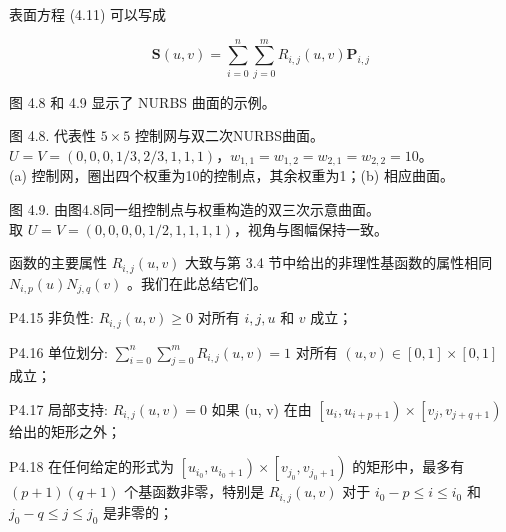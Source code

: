 \documentclass[../main.tex]{subfiles}
\begin{document}
表面方程 (4.11) 可以写成

\[
\mathbf{S}\left( {u,v}\right)  = \mathop{\sum }\limits_{{i = 0}}^{n}\mathop{\sum }\limits_{{j = 0}}^{m}{R}_{i,j}\left( {u,v}\right) {\mathbf{P}}_{i,j} \tag{4.13}
\]

图 4.8 和 4.9 显示了 NURBS 曲面的示例。

\begin{center}
\begin{minipage}{18cm}
\vspace*{.6\baselineskip}
\centering
{}
\par\smallskip
图 4.8. 代表性 \(5\times5\) 控制网与双二次NURBS曲面。\\ \(U=V=(0,0,0,1/3,2/3,1,1,1)\)，\(w_{1,1}=w_{1,2}=w_{2,1}=w_{2,2}=10\)。\\ (a) 控制网，圈出四个权重为10的控制点，其余权重为1；(b) 相应曲面。
\end{minipage}
\end{center}

\begin{center}
\begin{minipage}{18cm}
\vspace*{.6\baselineskip}
\centering
{}
\par\smallskip
图 4.9. 由图4.8同一组控制点与权重构造的双三次示意曲面。\\ 取 \(U=V=(0,0,0,0,1/2,1,1,1,1)\)，视角与图幅保持一致。
\end{minipage}
\end{center}

函数的主要属性 \({R}_{i,j}\left( {u,v}\right)\) 大致与第 3.4 节中给出的非理性基函数的属性相同 \({N}_{i,p}\left( u\right) {N}_{j,q}\left( v\right)\) 。我们在此总结它们。

P4.15 非负性: \({R}_{i,j}\left( {u,v}\right)  \geq  0\) 对所有 \(i,j,u\) 和 \(v\) 成立；

P4.16 单位划分: \(\mathop{\sum }\limits_{{i = 0}}^{n}\mathop{\sum }\limits_{{j = 0}}^{m}{R}_{i,j}\left( {u,v}\right)  = 1\) 对所有 \(\left( {u,v}\right)  \in  \left\lbrack  {0,1}\right\rbrack   \times  \left\lbrack  {0,1}\right\rbrack\) 成立；

P4.17 局部支持: \({R}_{i,j}\left( {u,v}\right)  = 0\) 如果 (u, v) 在由 \(\left\lbrack  {{u}_{i},{u}_{i + p + 1}}\right)  \times  \left\lbrack  {{v}_{j},{v}_{j + q + 1}}\right)\) 给出的矩形之外；

P4.18 在任何给定的形式为 \(\left\lbrack  {{u}_{{i}_{0}},{u}_{{i}_{0} + 1}}\right)  \times  \left\lbrack  {{v}_{{j}_{0}},{v}_{{j}_{0} + 1}}\right)\) 的矩形中，最多有 \(\left( {p + 1}\right) \left( {q + 1}\right)\) 个基函数非零，特别是 \({R}_{i,j}\left( {u,v}\right)\) 对于 \({i}_{0} - p \leq  i \leq  {i}_{0}\) 和 \({j}_{0} - q \leq  j \leq  {j}_{0}\) 是非零的；
\end{document}
